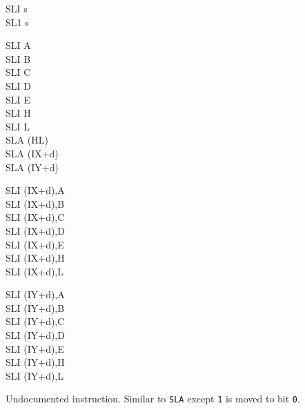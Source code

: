 \begin{basedescript}{
    \desclabelstyle{\multilinelabel}
    \desclabelwidth{3cm}}
\begin{DetailItem}{SLI s\UNDOC\\SL1 s\UNDOC}
        \begin{DetailVariants}
            SLI A\\
            SLI B\\
            SLI C\\
            SLI D\\
            SLI E\\
            SLI H\\
            SLI L\\
            SLA (HL)\\
            SLA (IX+d)\\
            SLA (IY+d)

            \columnbreak
            SLI (IX+d),A\UNDOC\\
            SLI (IX+d),B\UNDOC\\
            SLI (IX+d),C\UNDOC\\
            SLI (IX+d),D\UNDOC\\
            SLI (IX+d),E\UNDOC\\
            SLI (IX+d),H\UNDOC\\
            SLI (IX+d),L\UNDOC

            \columnbreak
            SLI (IY+d),A\UNDOC\\
            SLI (IY+d),B\UNDOC\\
            SLI (IY+d),C\UNDOC\\
            SLI (IY+d),D\UNDOC\\
            SLI (IY+d),E\UNDOC\\
            SLI (IY+d),H\UNDOC\\
            SLI (IY+d),L\UNDOC
        \end{DetailVariants}

        Undocumented instruction. Similar to {\tt SLA} except {\tt 1} is moved to bit {\tt 0}.

        \begin{DetailEffects}[p]
            \FlagsSLIr
        \end{DetailEffects}
						
        \begin{DetailTiming}
        \end{DetailTiming}



\end{DetailItem}
\end{basedescript}
